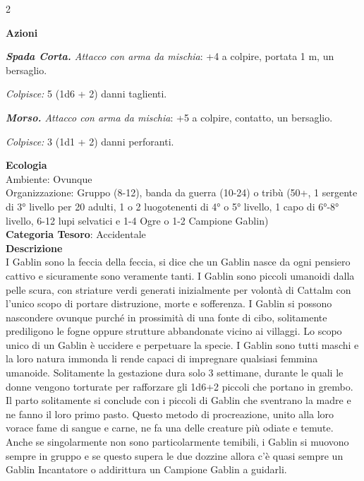 \begin{multicols}{2}
{\textbf{Azioni}

\emph{\textbf{Spada Corta.} Attacco con arma da mischia}: +4 a colpire, portata 1 m, un bersaglio.

\emph{Colpisce:} 5 (1d6 + 2) danni taglienti.

\emph{\textbf{Morso.} Attacco con arma da mischia}: +5 a colpire, contatto, un bersaglio.

\emph{Colpisce:} 3 (1d1 + 2) danni perforanti.

\textbf{Ecologia}\\
Ambiente: Ovunque\\
Organizzazione: Gruppo (8-12), banda da guerra (10-24) o tribù (50+, 1 sergente di 3° livello per 20 adulti, 1 o 2 luogotenenti di 4° o 5° livello, 1 capo di 6°-8° livello, 6-12 lupi selvatici e 1-4 Ogre o 1-2 Campione Gablin)\\
\textbf{Categoria Tesoro}: Accidentale\\
\textbf{Descrizione}\\
I Gablin sono la feccia della feccia, si dice che un Gablin nasce da ogni pensiero cattivo e sicuramente sono veramente tanti.
I Gablin sono piccoli umanoidi dalla pelle scura, con striature verdi generati inizialmente per volontà di Cattalm con l'unico scopo di portare distruzione, morte e sofferenza.
I Gablin si possono nascondere ovunque purché in prossimità di una fonte di cibo, solitamente prediligono le fogne oppure strutture abbandonate vicino ai villaggi.
Lo scopo unico di un Gablin è uccidere e perpetuare la specie. I Gablin sono tutti maschi e la loro natura immonda li rende capaci di impregnare qualsiasi femmina umanoide.
Solitamente la gestazione dura solo 3 settimane, durante le quali le donne vengono torturate per rafforzare gli 1d6+2 piccoli che portano in grembo. Il parto solitamente si conclude con i piccoli di Gablin che sventrano la madre e ne fanno il loro primo pasto.
Questo metodo di procreazione, unito alla loro vorace fame di sangue e carne, ne fa una delle creature più odiate e temute.
Anche se singolarmente non sono particolarmente temibili, i Gablin si muovono sempre in gruppo e se questo supera le due dozzine allora c'è quasi sempre un Gablin Incantatore o addirittura un Campione Gablin a guidarli.

}
\end{multicols}
